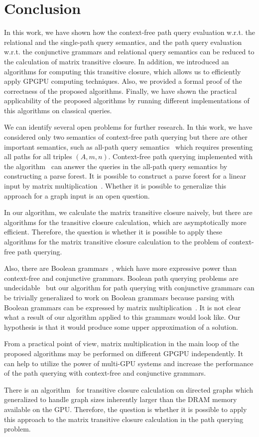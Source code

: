 \section{Conclusion}
In this work, we have shown how the context-free path query evaluation w.r.t. the relational and the single-path query semantics, and the path query evaluation w.r.t. the conjunctive grammars and relational query semantics can be reduced to the calculation of matrix transitive closure. In addition, we introduced an algorithms for computing this transitive closure, which allows us to efficiently apply GPGPU computing techniques. Also, we provided a formal proof of the correctness of the proposed algorithms. Finally, we have shown the practical applicability of the proposed algorithms by running different implementations of this algorithms on classical queries.

We can identify several open problems for further research. In this work, we have considered only two semantics of context-free path querying but there are other important semantics, such as all-path query semantics~\cite{hellingsPathQuerying} which requires presenting all paths for all triples $(A,m,n)$. Context-free path querying implemented with the algorithm~\cite{GLL} can answer the queries in the all-path query semantics by constructing a parse forest. It is possible to construct a parse forest for a linear input by matrix multiplication~\cite{okhotin_cyk}. Whether it is possible to generalize this approach for a graph input is an open question.

In our algorithm, we calculate the matrix transitive closure naively, but there are algorithms for the transitive closure calculation, which are asymptotically more efficient. Therefore, the question is whether it is possible to apply these algorithms for the matrix transitive closure calculation to the problem of context-free path querying.

Also, there are Boolean grammars~\cite{okhotinBoolean}, which have more expressive power than context-free and conjunctive grammars. Boolean path querying problems are undecidable~\cite{hellingsRelational} but our algorithm for path querying with conjunctive grammars can be trivially generalized to work on Boolean grammars because parsing with Boolean grammars can be expressed by matrix multiplication~\cite{okhotin_cyk}. It is not clear what a result of our algorithm applied to this grammars would look like. Our hypothesis is that it would produce some upper approximation of a solution.

From a practical point of view, matrix multiplication in the main loop of the proposed algorithms may be performed on different GPGPU independently. It can help to utilize the power of multi-GPU systems and increase the performance of the path querying with context-free and conjunctive grammars.

There is an algorithm~\cite{apspGPU} for transitive closure calculation on directed graphs which generalized to handle graph sizes inherently larger than the DRAM memory available on the GPU. Therefore, the question is whether it is possible to apply this approach to the matrix transitive closure calculation in the path querying problem.
